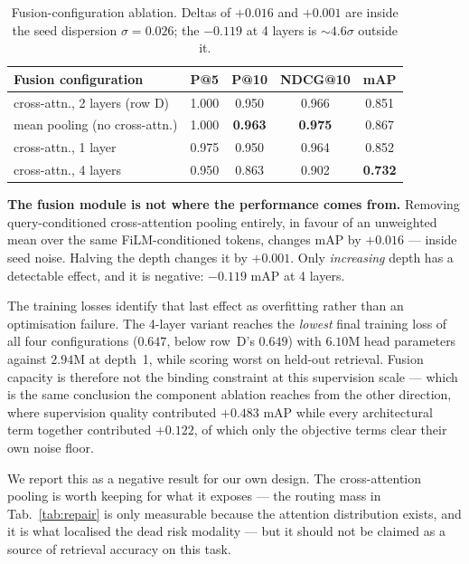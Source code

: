 \documentclass[10pt,twocolumn,letterpaper]{article}
\begin{document}
\begin{table}[t]\centering\footnotesize
\setlength{\tabcolsep}{3pt}
\begin{tabular}{lcccc}
\toprule
Fusion configuration & P@5 & P@10 & NDCG@10 & mAP \\
\midrule
cross-attn., 2 layers (row D) & 1.000 & 0.950 & 0.966 & 0.851 \\
mean pooling (no cross-attn.) & 1.000 & \textbf{0.963} & \textbf{0.975} & 0.867 \\
cross-attn., 1 layer          & 0.975 & 0.950 & 0.964 & 0.852 \\
cross-attn., 4 layers         & 0.950 & 0.863 & 0.902 & \textbf{0.732} \\
\bottomrule
\end{tabular}
\caption{Fusion-configuration ablation. Deltas of $+0.016$ and $+0.001$ are
inside the seed dispersion $\sigma=0.026$; the $-0.119$ at 4 layers is
${\sim}4.6\sigma$ outside it.}
\label{tab:qformer}
\end{table}

\noindent\textbf{The fusion module is not where the performance comes from.}
Removing query-conditioned cross-attention pooling entirely, in favour of an
unweighted mean over the same FiLM-conditioned tokens, changes mAP by
$+0.016$ --- inside seed noise. Halving the depth changes it by $+0.001$.
Only \emph{increasing} depth has a detectable effect, and it is negative:
$-0.119$ mAP at 4 layers.

The training losses identify that last effect as overfitting rather than an
optimisation failure. The 4-layer variant reaches the \emph{lowest} final
training loss of all four configurations ($0.647$, below row~D's $0.649$)
with $6.10$M head parameters against $2.94$M at depth~1, while scoring worst
on held-out retrieval. Fusion capacity is therefore not the binding
constraint at this supervision scale --- which is the same conclusion the
component ablation reaches from the other direction, where supervision
quality contributed $+0.483$ mAP while every architectural term together
contributed $+0.122$, of which only the objective terms clear their own
noise floor.

We report this as a negative result for our own design. The cross-attention
pooling is worth keeping for what it exposes --- the routing mass in
Tab.~\ref{tab:repair} is only measurable because the attention distribution
exists, and it is what localised the dead risk modality --- but it should not
be claimed as a source of retrieval accuracy on this task.
\end{document}
